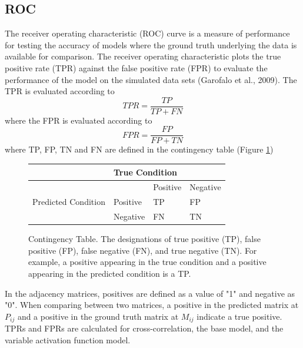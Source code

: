 \documentclass[11pt,titlepage]{article}
\begin{document}
\subsection{ROC}
The receiver operating characteristic (ROC) curve is a measure of performance for testing the accuracy of models where the ground truth underlying the data is available for comparison. The receiver operating characteristic plots the true positive rate (TPR) against the false positive rate (FPR) to evaluate the performance of the model on the simulated data sets (Garofalo et al., 2009). The TPR is evaluated according to $$TPR = \frac{TP}{TP + FN}$$ where the FPR is evaluated according to $$FPR = \frac{FP}{FP + TN}$$ where TP, FP, TN and FN are defined in the contingency table (Figure \ref{contingencyTable})

\begin{figure}[H]
\centering
\begin{tabular}{|l|l|l|l|}
\hline
                                     & \multicolumn{3}{l|}{True Condition} \\ \hline
\multirow{3}{*}{Predicted Condition} &            & Positive   & Negative  \\ \cline{2-4} 
                                     & Positive   & TP         & FP        \\ \cline{2-4} 
                                     & Negative   & FN         & TN        \\ \hline
\end{tabular}
\caption[Contingency Table]{Contingency Table. The designations of true positive (TP), false positive (FP), false negative (FN), and true negative (TN). For example, a positive appearing in the true condition and a positive appearing in the predicted condition is a TP.}
\label{contingencyTable}
\end{figure}
In the adjacency matrices, positives are defined as a value of "1" and negative as "0". When comparing between two matrices, a positive in the predicted matrix at $P_{ij}$ and a positive in the ground truth matrix at $M_{ij}$ indicate a true positive. TPRs and FPRs are calculated for cross-correlation, the base model, and the variable activation function model.\par
\end{document}
